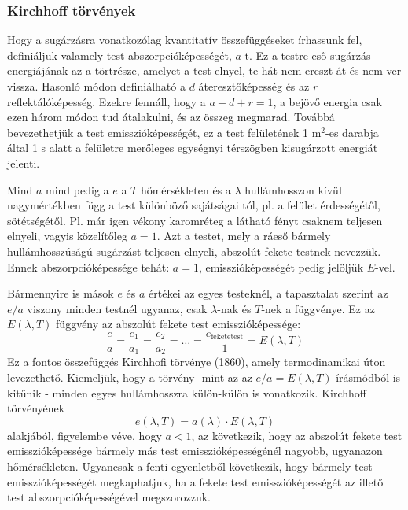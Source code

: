 \documentclass[a4paper,12pt]{article}
\begin{document}
\subsubsection{Kirchhoff törvények}
Hogy a sugárzásra vonatkozólag kvantitatív összefüggéseket írhassunk fel, definiáljuk valamely test abszorpcióképességét, $a$-t. Ez a testre eső sugárzás energiájának az a törtrésze, amelyet a test elnyel, te hát nem ereszt át és nem
ver vissza. Hasonló módon definiálható a $d$ áteresztőképesség és az $r$ reflektálóképesség. Ezekre fennáll, hogy a $a + d + r = 1$, a bejövő energia csak ezen
három módon tud átalakulni, és az összeg megmarad. Továbbá bevezethetjük a test emisszióképességét, ez a test felületének 1 m$^2$-es darabja által
1 s alatt a felületre merőleges egységnyi térszögben kisugárzott energiát jelenti.

Mind $a$ mind pedig a $e$ a $T$ hőmérsékleten és a $\lambda$ hullámhosszon kívül nagymértékben függ a test különböző sajátságai tól, pl. a felület érdességétől, sötétségétől. Pl. már igen vékony karomréteg a látható fényt csaknem teljesen elnyeli, vagyis közelítőleg $a = 1$. Azt a testet, mely a ráeső bármely
hullámhosszúságú sugárzást teljesen elnyeli, abszolút fekete testnek nevezzük. Ennek abszorpcióképessége tehát: $a = 1$, emisszióképességét pedig jelöljük $E$-vel.

Bármennyire is mások $e$ és $a$ értékei az egyes testeknél, a tapasztalat szerint az $e/a$ viszony minden testnél ugyanaz, csak $\lambda$-nak és $T$-nek a függvénye. Ez az $E(\lambda, T)$ függvény az abszolút fekete test emisszióképessége:
\begin{equation}
    \frac{e}{a} = \frac{e_1}{a_1} = \frac{e_2}{a_2} = \ldots = \frac{e_{\text{feketetest}}}{1} = E(\lambda, T)
\end{equation}
Ez a fontos összefüggés Kirchhofi törvénye (1860), amely termodinamikai úton levezethető. Kiemeljük, hogy a törvény- mint az az $e/a= E(\lambda, T)$
írásmódból is kitűnik - minden egyes hullámhosszra külön-külön is vonatkozik. Kirchhoff törvényének
\begin{equation}
    e(\lambda, T) = a(\lambda) \cdot E(\lambda, T)
\end{equation}
alakjából, figyelembe véve, hogy $a < 1$, az következik, hogy az abszolút fekete test emisszióképessége bármely más test emisszióképességénél nagyobb,
ugyanazon hőmérsékleten. Ugyancsak a fenti egyenletből következik, hogy bármely test emisszióképességét megkaphatjuk, ha a fekete test emisszióképességét az illető test abszorpcióképességével megszorozzuk.
\end{document}
